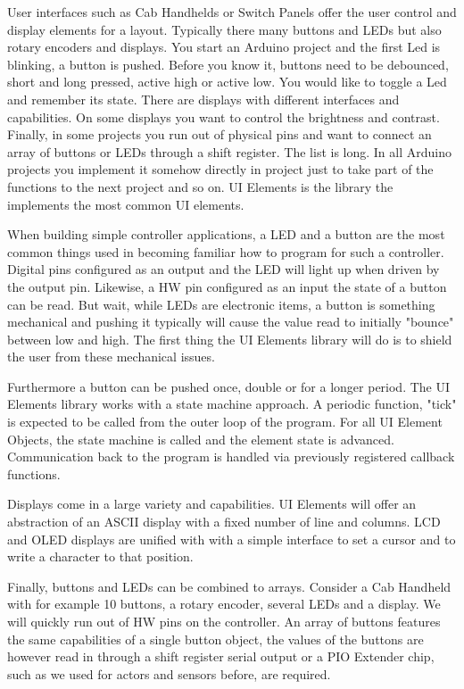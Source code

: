 
User interfaces such as Cab Handhelds or Switch Panels offer the user control and display elements for a layout. Typically there many buttons and LEDs but also rotary encoders and displays. You start an Arduino project and the first Led is blinking, a button is pushed. Before you know it, buttons need to be debounced, short and long pressed, active high or active low. You would like to toggle a Led and remember its state. There are displays with different interfaces and capabilities. On some displays you want to control the brightness and contrast. Finally, in some projects you run out of physical pins and want to connect an array of buttons or LEDs through a shift register. The list is long. In all Arduino projects you implement it somehow directly in project just to take part of the functions to the next project and so on. UI Elements is the library the implements the most common UI elements.


When building simple controller applications, a LED and a button are the most common things used in becoming familiar how to program for such a controller. Digital pins configured as an output and the LED will light up when driven by the output pin. Likewise, a HW pin configured as an input the state of a button can be read. But wait, while LEDs are electronic items, a button is something mechanical and pushing it typically will cause the value read to initially "bounce" between low and high. The first thing the UI Elements library will do is to shield the user from these mechanical issues.

Furthermore a button can be pushed once, double or for a longer period. The UI Elements library works with a state machine approach. A periodic function, "tick" is expected to be called from the outer loop of the program. For all UI Element Objects, the state machine is called and the element state is advanced. Communication back to the program is handled via previously registered callback functions.

Displays come in a large variety and capabilities. UI Elements will offer an abstraction of an ASCII display with a fixed number of line and columns. LCD and OLED displays are unified with with a simple interface to set a cursor and to write a character to that position.

Finally, buttons and LEDs can be combined to arrays. Consider a Cab Handheld with for example 10 buttons, a rotary encoder, several LEDs and a display. We will quickly run out of HW pins on the controller. An array of buttons features the same capabilities of a single button object, the values of the buttons are however read in through a shift register serial output or a PIO Extender chip, such as we used for actors and sensors before, are required.

